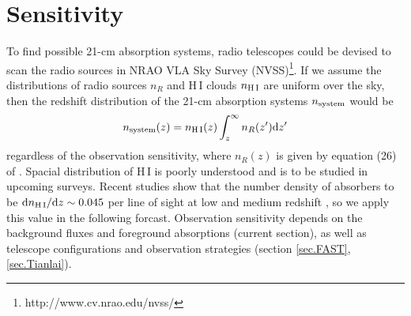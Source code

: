 \documentclass[]{raa}
\newcommand{\diff}{{\rm d}}
\newcommand{\HI}{{H{\small\,I}}}
\begin{document}
\section{Sensitivity}\label{sec.sensitivity}
To find possible 21-cm absorption systems, radio telescopes
could be devised to scan the radio sources in
NRAO VLA Sky Survey (NVSS)\footnote{http://www.cv.nrao.edu/nvss/}.
If we assume the distributions of radio sources $n_R$ and
{\HI} clouds $n_{\rm \HI}$ are uniform over the sky, then the redshift
distribution of the 21-cm absorption systems $n_{\rm system}$ would be
\begin{equation}\label{eq.n_system}
    n_{\rm system}(z)=n_{\rm \HI}(z)\int_z^\infty n_R(z')\diff z'
\end{equation}
regardless of the observation sensitivity,
where $n_R(z)$ is given by equation (26) of \cite{2010A&ARv..18....1D}.
Spacial distribution of {\HI} is poorly understood and is to be
studied in upcoming surveys.
Recent studies show that the number density of
absorbers to be $\diff n_{\rm \HI}/\diff z\sim 0.045$
per line of sight at low and medium redshift
\citep{2005ARA&A..43..861W,2007ASSP....3..501Z}, so we apply this value
in the following forcast.
Observation sensitivity depends on the background fluxes and foreground
absorptions (current section), as well as telescope configurations and
observation strategies (section \ref{sec.FAST},\ref{sec.Tianlai}).
\end{document}
